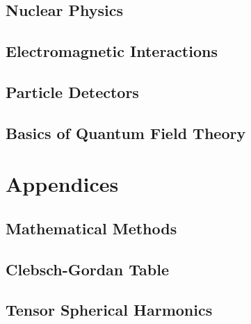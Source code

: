\documentclass[a4paper, 11pt]{book}
\begin{document}
	\chapter{Nuclear Physics}
	
	\chapter{Electromagnetic Interactions}
	
	\chapter{Particle Detectors}
	
	\chapter{Basics of Quantum Field Theory}
	
%	
%	
%		
\part{Appendices}
\appendix
	\chapter{Mathematical Methods}
		
	\chapter{Clebsch-Gordan Table}\label{app:cgt}
		
	\chapter{Tensor Spherical Harmonics}\label{app:tsh}
		
\end{document}
